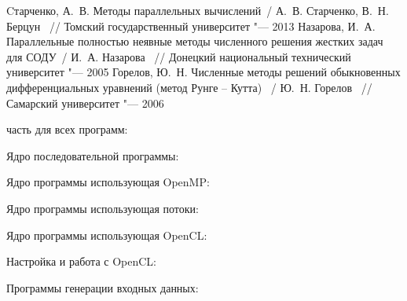\documentclass[14pt,final,titlepage,pscyr]{hedwork}
\begin{document}
\newpage

\renewcommand{\bibname}{Список используемой литературы}
\begin{thebibliography}{10}
	 Cтарченко, А.~В. Методы параллельных вычислений~/ А.~В. Старченко, В.~Н. Берцун ~// 
		Томский государственный университет "--- 2013
	 Назарова, И.~А. Параллельные полностью неявные методы численного решения жестких 
		задач для СОДУ~/ И.~А. Назарова ~// Донецкий национальный технический университет "--- 2005
	 Горелов, Ю.~Н. Численные методы решений обыкновенных дифференциальных уравнений 
		(метод Рунге -- Кутта) ~/ Ю.~Н. Горелов ~// Самарский университет "--- 2006
\end{thebibliography}

\newpage

\label{sec:app}
 часть для всех программ:


\newpage

Ядро последовательной программы:


\newpage

Ядро программы использующая OpenMP:


\newpage

Ядро программы использующая потоки:


\newpage

Ядро программы использующая OpenCL:


Настройка и работа с OpenCL:


Программы генерации входных данных:



\end{document}
